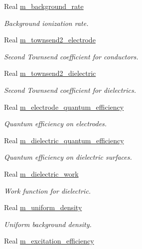 \begin{DoxyCompactItemize}
Real \hyperlink{classair__bolsig_a3d872a5d86ec4be2f5e962adceb622da}{m\+\_\+background\+\_\+rate}
\begin{DoxyCompactList}\small\item\em Background ionization rate. \end{DoxyCompactList}\item 
Real \hyperlink{classair__bolsig_aa024b1721750a7dbf9b54d9b541c17e2}{m\+\_\+townsend2\+\_\+electrode}
\begin{DoxyCompactList}\small\item\em Second Townsend coefficient for conductors. \end{DoxyCompactList}\item 
Real \hyperlink{classair__bolsig_a6945cbd06dc3718e9f8a1cd833570104}{m\+\_\+townsend2\+\_\+dielectric}
\begin{DoxyCompactList}\small\item\em Second Townsend coefficient for dielectrics. \end{DoxyCompactList}\item 
Real \hyperlink{classair__bolsig_ad84a1665143e64c70ceecd5531040345}{m\+\_\+electrode\+\_\+quantum\+\_\+efficiency}
\begin{DoxyCompactList}\small\item\em Quantum efficiency on electrodes. \end{DoxyCompactList}\item 
Real \hyperlink{classair__bolsig_a0e11589882b9910a65bc4847cccbaca4}{m\+\_\+dielectric\+\_\+quantum\+\_\+efficiency}
\begin{DoxyCompactList}\small\item\em Quantum efficiency on dielectric surfaces. \end{DoxyCompactList}\item 
Real \hyperlink{classair__bolsig_ab994b1243b63cf1cec12d8aed042d494}{m\+\_\+dielectric\+\_\+work}
\begin{DoxyCompactList}\small\item\em Work function for dielectric. \end{DoxyCompactList}\item 
Real \hyperlink{classair__bolsig_afd1faef720f2f4c07ef7c90467d5f9f7}{m\+\_\+uniform\+\_\+density}
\begin{DoxyCompactList}\small\item\em Uniform background density. \end{DoxyCompactList}\item 
Real \hyperlink{classair__bolsig_ad2417ddb9e4d2f2f9963e69b02dad2a2}{m\+\_\+excitation\+\_\+efficiency}

\end{DoxyCompactItemize}
